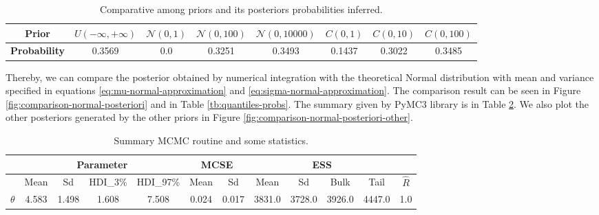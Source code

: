 \documentclass[a4paper,10pt, notitlepage]{report}
\theoremstyle{plain}
\begin{document}
\begin{table}[ht]
    \centering
    \begin{tabular}{|c|c|c|c|c|c|c|c|}
        \hline
        \textbf{Prior}       & $U(-\infty, +\infty)$ & $\mathcal{N}(0,1)$ & $\mathcal{N}(0,100)$ & $\mathcal{N}(0,10000)$ & $C(0,1)$ & $C(0,10)$ & $C(0,100)$ \\ \hline
        \textbf{Probability} & 0.3569                & 0.0                  & 0.3251               & 0.3493                 & 0.1437   & 0.3022    & 0.3485      \\ \hline
        \end{tabular}
    \caption{Comparative among priors and its posteriors probabilities inferred.}
    \label{tb:table-prob}
\end{table}

Thereby, we can compare the posterior obtained by numerical integration with
the theoretical Normal distribution with mean and variance specified in equations
\ref{eq:mu-normal-approximation} and \ref{eq:sigma-normal-approximation}. The
comparison result can be seen in Figure
\ref{fig:comparison-normal-posteriori} and in Table \ref{tb:quantiles-probs}. The summary given by PyMC3 library is
in Table \ref{tb:mcmc-result}. We also plot the other posteriors generated by
the other priors in Figure \ref{fig:comparison-normal-posteriori-other}. 

\begin{table}[ht]
    \centering
    \begin{tabular}{|c|c|c|c|c|c|c|c|c|c|c|c|}
        \hline
         & \multicolumn{4}{c|}{Parameter} & \multicolumn{2}{c|}{MCSE} &
        \multicolumn{4}{c|}{ESS} &  \\
        \hline 
         &   Mean &  Sd &  HDI\_3\% &  HDI\_97\% &  Mean &  Sd &  Mean &  Sd &  Bulk &  Tail &  $\hat{R}$ \\
        \hline
        $\theta$ &  4.583 &  1.498 &   1.608 &    7.508 &      0.024 &    0.017 &    3831.0 &  3728.0 &    3926.0 &    4447.0 &    1.0 \\
        \hline
    \end{tabular}
    \caption{Summary MCMC routine and some statistics.}
    \label{tb:mcmc-result}
\end{table}
\end{document}
